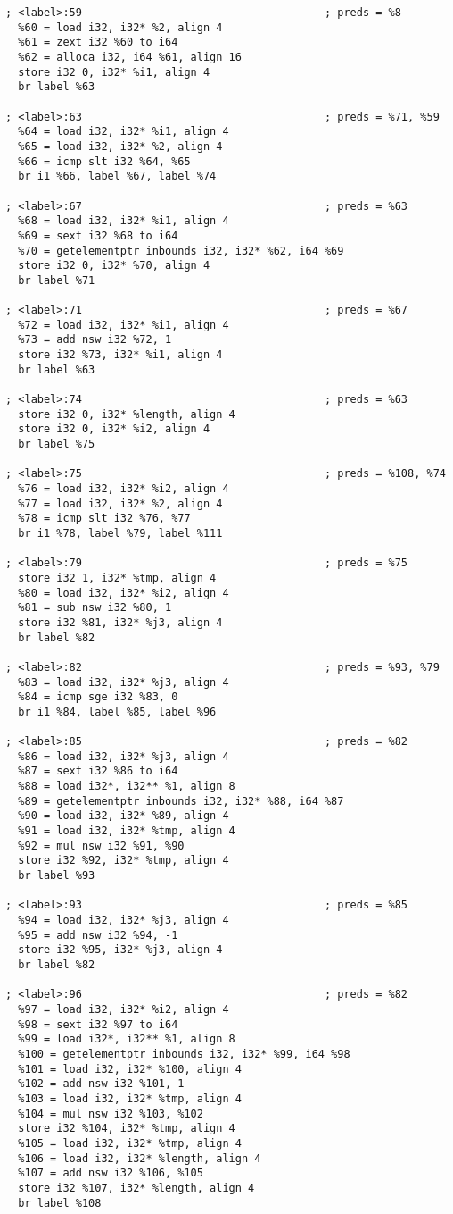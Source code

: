 \begin{verbatim}
; <label>:59                                      ; preds = %8
  %60 = load i32, i32* %2, align 4
  %61 = zext i32 %60 to i64
  %62 = alloca i32, i64 %61, align 16
  store i32 0, i32* %i1, align 4
  br label %63

; <label>:63                                      ; preds = %71, %59
  %64 = load i32, i32* %i1, align 4
  %65 = load i32, i32* %2, align 4
  %66 = icmp slt i32 %64, %65
  br i1 %66, label %67, label %74

; <label>:67                                      ; preds = %63
  %68 = load i32, i32* %i1, align 4
  %69 = sext i32 %68 to i64
  %70 = getelementptr inbounds i32, i32* %62, i64 %69
  store i32 0, i32* %70, align 4
  br label %71

; <label>:71                                      ; preds = %67
  %72 = load i32, i32* %i1, align 4
  %73 = add nsw i32 %72, 1
  store i32 %73, i32* %i1, align 4
  br label %63

; <label>:74                                      ; preds = %63
  store i32 0, i32* %length, align 4
  store i32 0, i32* %i2, align 4
  br label %75

; <label>:75                                      ; preds = %108, %74
  %76 = load i32, i32* %i2, align 4
  %77 = load i32, i32* %2, align 4
  %78 = icmp slt i32 %76, %77
  br i1 %78, label %79, label %111

; <label>:79                                      ; preds = %75
  store i32 1, i32* %tmp, align 4
  %80 = load i32, i32* %i2, align 4
  %81 = sub nsw i32 %80, 1
  store i32 %81, i32* %j3, align 4
  br label %82

; <label>:82                                      ; preds = %93, %79
  %83 = load i32, i32* %j3, align 4
  %84 = icmp sge i32 %83, 0
  br i1 %84, label %85, label %96

; <label>:85                                      ; preds = %82
  %86 = load i32, i32* %j3, align 4
  %87 = sext i32 %86 to i64
  %88 = load i32*, i32** %1, align 8
  %89 = getelementptr inbounds i32, i32* %88, i64 %87
  %90 = load i32, i32* %89, align 4
  %91 = load i32, i32* %tmp, align 4
  %92 = mul nsw i32 %91, %90
  store i32 %92, i32* %tmp, align 4
  br label %93

; <label>:93                                      ; preds = %85
  %94 = load i32, i32* %j3, align 4
  %95 = add nsw i32 %94, -1
  store i32 %95, i32* %j3, align 4
  br label %82

; <label>:96                                      ; preds = %82
  %97 = load i32, i32* %i2, align 4
  %98 = sext i32 %97 to i64
  %99 = load i32*, i32** %1, align 8
  %100 = getelementptr inbounds i32, i32* %99, i64 %98
  %101 = load i32, i32* %100, align 4
  %102 = add nsw i32 %101, 1
  %103 = load i32, i32* %tmp, align 4
  %104 = mul nsw i32 %103, %102
  store i32 %104, i32* %tmp, align 4
  %105 = load i32, i32* %tmp, align 4
  %106 = load i32, i32* %length, align 4
  %107 = add nsw i32 %106, %105
  store i32 %107, i32* %length, align 4
  br label %108


\end{verbatim}
